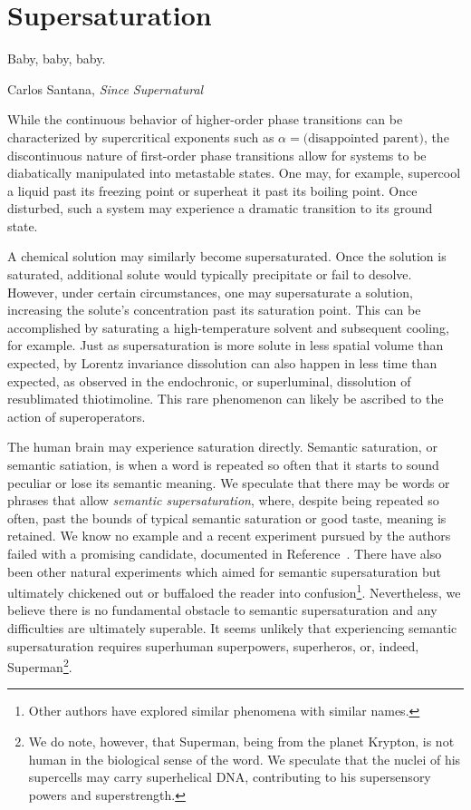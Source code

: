 \section{Supersaturation}

\epigraph{Baby, baby, baby.
}{Carlos Santana, \textit{Since Supernatural}}

While the continuous behavior of higher-order phase transitions can be characterized by supercritical exponents such as $\alpha=\text{(disappointed parent)}$, the discontinuous nature of first-order phase transitions allow for systems to be diabatically manipulated into metastable states.
One may, for example, supercool a liquid past its freezing point or superheat it past its boiling point.
Once disturbed, such a system may experience a dramatic transition to its ground state.


A chemical solution may similarly become supersaturated.
Once the solution is saturated, additional solute would typically precipitate or fail to desolve.
However, under certain circumstances, one may supersaturate a solution, increasing the solute's concentration past its saturation point.
This can be accomplished by saturating a high-temperature solvent and subsequent cooling, for example.
Just as supersaturation is more solute in less spatial volume than expected, by Lorentz invariance dissolution can also happen in less time than expected, as observed in the endochronic, or superluminal, dissolution of resublimated thiotimoline\cite{asimov:1948,asimov:1953,asimov:1960,vernon:2022}.
This rare phenomenon can likely be ascribed to the action of superoperators\cite{Deutsch:1991nm}.

The human brain may experience saturation directly.
Semantic saturation, or semantic satiation, is when a word is repeated so often that it starts to sound peculiar or lose its semantic meaning.
We speculate that there may be words or phrases that allow \emph{semantic supersaturation}, where, despite being repeated so often, past the bounds of typical semantic saturation or good taste, meaning is retained.
We know no example and a recent experiment pursued by the authors failed with a promising candidate, documented in Reference~\cite{self}.
There have also been other natural experiments which aimed for semantic supersaturation but ultimately chickened out\cite{chicken} or buffaloed the reader into confusion\cite{buffalo}\footnote{
Other authors have explored similar phenomena with similar names\cite{greenberg1994bosons,goodman2015few}.}.
Nevertheless, we believe there is no fundamental obstacle to semantic supersaturation and any difficulties are ultimately superable.
It seems unlikely that experiencing semantic supersaturation requires superhuman superpowers, superheros, or, indeed, Superman\footnote{We do note, however, that Superman, being from the planet Krypton, is not human in the biological sense of the word.  We speculate that the nuclei of his supercells may carry superhelical DNA, contributing to his supersensory powers and superstrength.}\cite{tippett:2009}.

